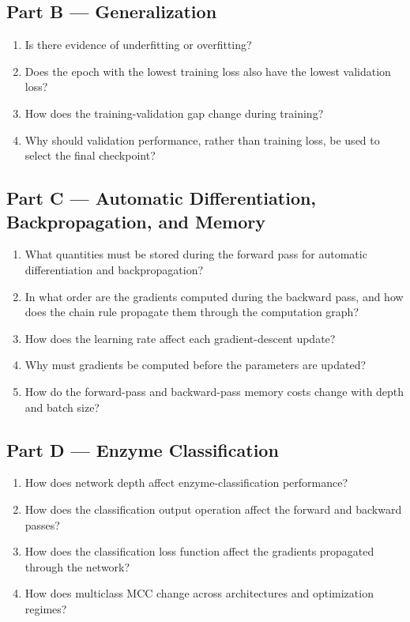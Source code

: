 \documentclass[11pt,a4paper]{article}
\begin{document}
\subsection*{Part B --- Generalization}

\begin{enumerate}
    \item Is there evidence of underfitting or overfitting?
    \item Does the epoch with the lowest training loss also have the lowest validation loss?
    \item How does the training-validation gap change during training?
    \item Why should validation performance, rather than training loss, be used to select the final checkpoint?
\end{enumerate}

\subsection*{Part C --- Automatic Differentiation, Backpropagation, and Memory}

\begin{enumerate}
    \item What quantities must be stored during the forward pass for automatic differentiation and backpropagation?
    \item In what order are the gradients computed during the backward pass, and how does the chain rule propagate them through the computation graph?
    \item How does the learning rate affect each gradient-descent update?
    \item Why must gradients be computed before the parameters are updated?
    \item How do the forward-pass and backward-pass memory costs change with depth and batch size?
\end{enumerate}

\subsection*{Part D --- Enzyme Classification}

\begin{enumerate}
    \item How does network depth affect enzyme-classification performance?
    \item How does the classification output operation affect the forward and backward passes?
    \item How does the classification loss function affect the gradients propagated through the network?
    \item How does multiclass MCC change across architectures and optimization regimes?
\end{enumerate}
\end{document}
